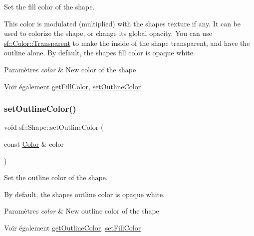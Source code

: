 Set the fill color of the shape. 

This color is modulated (multiplied) with the shape\textquotesingle{}s texture if any. It can be used to colorize the shape, or change its global opacity. You can use \hyperlink{classsf_1_1Color_a569b45471737f770656f50ae7bbac292}{sf\+::\+Color\+::\+Transparent} to make the inside of the shape transparent, and have the outline alone. By default, the shape\textquotesingle{}s fill color is opaque white.


\begin{DoxyParams}{Paramètres}
{\em color} & New color of the shape\\
\hline
\end{DoxyParams}
\begin{DoxySeeAlso}{Voir également}
\hyperlink{classsf_1_1Shape_ae3030128824e687f259d18addcf33528}{get\+Fill\+Color}, \hyperlink{classsf_1_1Shape_a5978f41ee349ac3c52942996dcb184f7}{set\+Outline\+Color} 
\end{DoxySeeAlso}
\mbox{\label{classsf_1_1Shape_a5978f41ee349ac3c52942996dcb184f7}} 
\subsubsection{\texorpdfstring{set\+Outline\+Color()}{setOutlineColor()}}
{\footnotesize\ttfamily void sf\+::\+Shape\+::set\+Outline\+Color (\begin{DoxyParamCaption}\item[{const \hyperlink{classsf_1_1Color}{Color} \&}]{color }\end{DoxyParamCaption})}



Set the outline color of the shape. 

By default, the shape\textquotesingle{}s outline color is opaque white.


\begin{DoxyParams}{Paramètres}
{\em color} & New outline color of the shape\\
\hline
\end{DoxyParams}
\begin{DoxySeeAlso}{Voir également}
\hyperlink{classsf_1_1Shape_a6598feed5fea1325a36b0f3a615ac55c}{get\+Outline\+Color}, \hyperlink{classsf_1_1Shape_a3506f9b5d916fec14d583d16f23c2485}{set\+Fill\+Color} 
\end{DoxySeeAlso}
\mbox{\label{classsf_1_1Shape_a5ad336ad74fc1f567fce3b7e44cf87dc}} 
